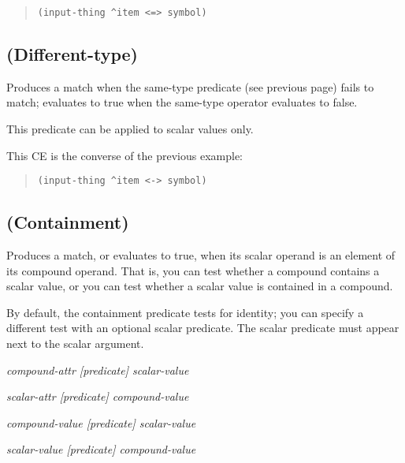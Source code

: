 \begin{quote}
\begin{verbatim}
(input-thing ^item <=> symbol)
\end{verbatim}
\end{quote}

\subsection{\co{<->} (Different-type)}

Produces a match when the same-type predicate (see previous page)
fails to match; evaluates to true when the same-type operator
evaluates to false.

This predicate can be applied to scalar values only.

\Example

This CE is the converse of the previous example:

\begin{quote}
\begin{verbatim}
(input-thing ^item <-> symbol)
\end{verbatim}
\end{quote}

\subsection{\co{[+]} (Containment)}

Produces a match, or evaluates to true, when its scalar operand is an
element of its compound operand. That is, you can test whether a
compound contains a scalar value, or you can test whether a scalar
value is contained in a compound.

By default, the containment predicate tests for identity; you can
specify a different test with an optional scalar predicate. The scalar
predicate must appear next to the scalar argument.

\Format

\ct\it{compound-attr} \co{[+]} [\it{predicate}] \it{scalar-value}

\ct\it{scalar-attr} [\it{predicate}] \co{[+]} \it{compound-value}

\it{compound-value} \co{[+]} [\it{predicate}] \it{scalar-value}

\it{scalar-value} [\it{predicate}] \co{[+]} \it{compound-value}

